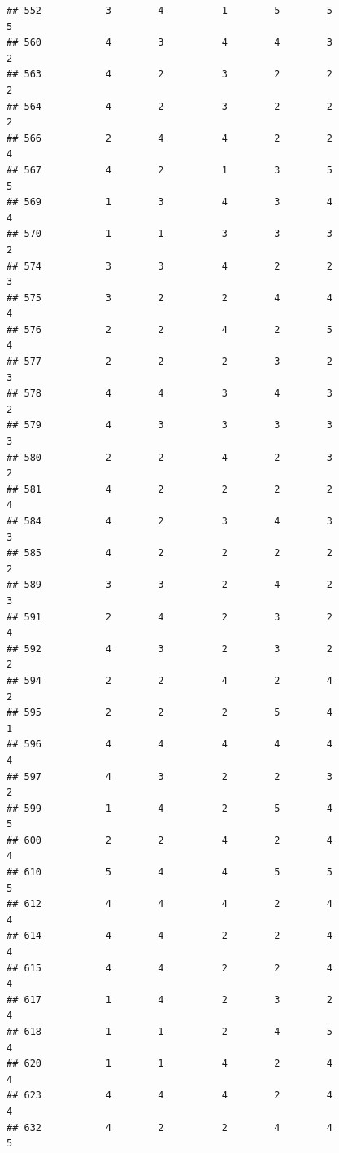 \documentclass[
]{article}
\begin{document}
\begin{verbatim}
## 552           3        4          1        5        5               5
## 560           4        3          4        4        3               2
## 563           4        2          3        2        2               2
## 564           4        2          3        2        2               2
## 566           2        4          4        2        2               4
## 567           4        2          1        3        5               5
## 569           1        3          4        3        4               4
## 570           1        1          3        3        3               2
## 574           3        3          4        2        2               3
## 575           3        2          2        4        4               4
## 576           2        2          4        2        5               4
## 577           2        2          2        3        2               3
## 578           4        4          3        4        3               2
## 579           4        3          3        3        3               3
## 580           2        2          4        2        3               2
## 581           4        2          2        2        2               4
## 584           4        2          3        4        3               3
## 585           4        2          2        2        2               2
## 589           3        3          2        4        2               3
## 591           2        4          2        3        2               4
## 592           4        3          2        3        2               2
## 594           2        2          4        2        4               2
## 595           2        2          2        5        4               1
## 596           4        4          4        4        4               4
## 597           4        3          2        2        3               2
## 599           1        4          2        5        4               5
## 600           2        2          4        2        4               4
## 610           5        4          4        5        5               5
## 612           4        4          4        2        4               4
## 614           4        4          2        2        4               4
## 615           4        4          2        2        4               4
## 617           1        4          2        3        2               4
## 618           1        1          2        4        5               4
## 620           1        1          4        2        4               4
## 623           4        4          4        2        4               4
## 632           4        2          2        4        4               5

\end{verbatim}
\end{document}
